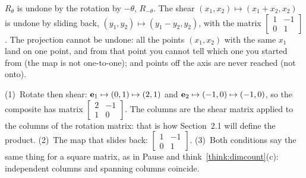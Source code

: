 \documentclass[11pt]{article}
\begin{document}
\begin{description}[leftmargin=0pt,itemsep=5pt]
  \item[Pause and think \ref{think:undo}.] $R_\theta$ is undone by the rotation by $-\theta$, $R_{-\theta}$. The shear $(x_1,x_2)\mapsto(x_1+x_2,x_2)$ is undone by sliding back, $(y_1,y_2)\mapsto(y_1-y_2,y_2)$, with the matrix $\begin{bmatrix}1&-1\\0&1\end{bmatrix}$. The projection cannot be undone: all the points $(x_1,x_2)$ with the same $x_1$ land on one point, and from that point you cannot tell which one you started from (the map is not one-to-one); and points off the axis are never reached (not onto).
  \item[Before the next section.] (1)~Rotate then shear: $\mathbf{e}_1\mapsto(0,1)\mapsto(2,1)$ and $\mathbf{e}_2\mapsto(-1,0)\mapsto(-1,0)$, so the composite has matrix $\begin{bmatrix}2&-1\\1&0\end{bmatrix}$. The columns are the shear matrix applied to the columns of the rotation matrix: that is how Section~2.1 will define the product. (2)~The map that slides back: $\begin{bmatrix}1&-1\\0&1\end{bmatrix}$. (3)~Both conditions say the same thing for a square matrix, as in Pause and think~\ref{think:dimcount}(c): independent columns and spanning columns coincide.
\end{description}
\end{document}
